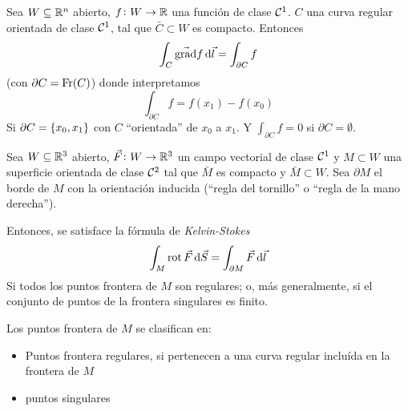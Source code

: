 \begin{teo}
    Sea $W \subseteq \mathbb{R}^n$ abierto, $f \colon W \to \mathbb{R}$ una función de clase $\mathcal{C}^1$. $C$ una curva regular orientada de clase
    $\mathcal{C}^1$, tal que $\bar{C} \subset W$ es compacto. Entonces
    \[
        \int_C \vec{\grad} f \dif \vec{l} = \int_{\partial C} f
    \]
    (con $\partial C = \operatorname{Fr}(C)$) donde interpretamos
    \[
        \int_{\partial C} f = f\left( x_1 \right) - f\left( x_0 \right)
    \]
    Si $\partial C = \left\{x_0, x_1\right\}$ con $C$ ``orientada'' de $x_0$ a $x_1$. Y $\int_{\partial C} f = 0$ si $\partial C = \emptyset$.
\end{teo}
\begin{teo}\label{teo:kelvin-stokes}
    Sea $W \subseteq \mathbb{R}^3$ abierto, $\vec{F} \colon W \to \mathbb{R}^3$ un campo vectorial de clase $\mathcal{C}^1$ y $M \subset W$ una superficie
    orientada de clase $\mathcal{C}^2$ tal que $\bar{M}$ es compacto y $\bar{M} \subset W$. Sea $\partial M$ el borde de $M$ con la orientación
    inducida (``regla del tornillo'' o ``regla de la mano derecha'').

    Entonces, se satisface la fórmula de \emph{Kelvin-Stokes}
    \[
        \int_M \rot \vec{F} \dif \vec{S} = \int_{\partial M} \vec{F} \dif \vec{l}
    \]
    Si todos los puntos frontera de $M$ son regulares; o, más generalmente, si el conjunto de puntos de la frontera singulares es finito.
\end{teo}

\begin{obs*}
    Los puntos frontera de $M$ se clasifican en:
    \begin{itemize}
        \item Puntos frontera regulares, si pertenecen a una curva regular incluída en la frontera de $M$
        \item puntos singulares
    \end{itemize}
\end{obs*}

